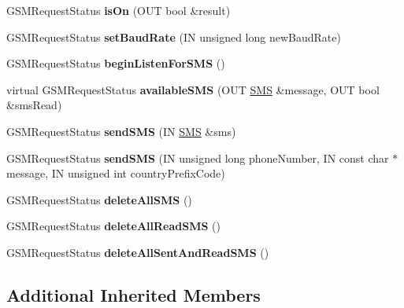 \begin{DoxyCompactItemize}
G\+S\+M\+Request\+Status {\bfseries is\+On} (O\+UT bool \&result)
\item 
\mbox{\label{class_easyuino_1_1_g_s_m_service_a6b6ee723ceaf62bfd9312278b5dbf36d}} 
G\+S\+M\+Request\+Status {\bfseries set\+Baud\+Rate} (IN unsigned long new\+Baud\+Rate)
\item 
\mbox{\label{class_easyuino_1_1_g_s_m_service_a8fd764ef215a16f676e6e5e4b283b61d}} 
G\+S\+M\+Request\+Status {\bfseries begin\+Listen\+For\+S\+MS} ()
\item 
\mbox{\label{class_easyuino_1_1_g_s_m_service_a02c2bddace1c87f035f324ae248c4f1d}} 
virtual G\+S\+M\+Request\+Status {\bfseries available\+S\+MS} (O\+UT \hyperlink{class_easyuino_1_1_s_m_s}{S\+MS} \&message, O\+UT bool \&sms\+Read)
\item 
\mbox{\label{class_easyuino_1_1_g_s_m_service_ae860cc330ef552c733d9ab4a5c2fd366}} 
G\+S\+M\+Request\+Status {\bfseries send\+S\+MS} (IN \hyperlink{class_easyuino_1_1_s_m_s}{S\+MS} \&sms)
\item 
\mbox{\label{class_easyuino_1_1_g_s_m_service_ad37d83f2a91fbe2e50a11f1d435eccb5}} 
G\+S\+M\+Request\+Status {\bfseries send\+S\+MS} (IN unsigned long phone\+Number, IN const char $\ast$message, IN unsigned int country\+Prefix\+Code)
\item 
\mbox{\label{class_easyuino_1_1_g_s_m_service_aef4379e7c82f275f0af341f79a3b451f}} 
G\+S\+M\+Request\+Status {\bfseries delete\+All\+S\+MS} ()
\item 
\mbox{\label{class_easyuino_1_1_g_s_m_service_af142e4f7d99cffda9a3598446466cdb3}} 
G\+S\+M\+Request\+Status {\bfseries delete\+All\+Read\+S\+MS} ()
\item 
\mbox{\label{class_easyuino_1_1_g_s_m_service_a7b457ab0669a8e9c16ab1906cc246365}} 
G\+S\+M\+Request\+Status {\bfseries delete\+All\+Sent\+And\+Read\+S\+MS} ()
\end{DoxyCompactItemize}
\subsection*{Additional Inherited Members}


